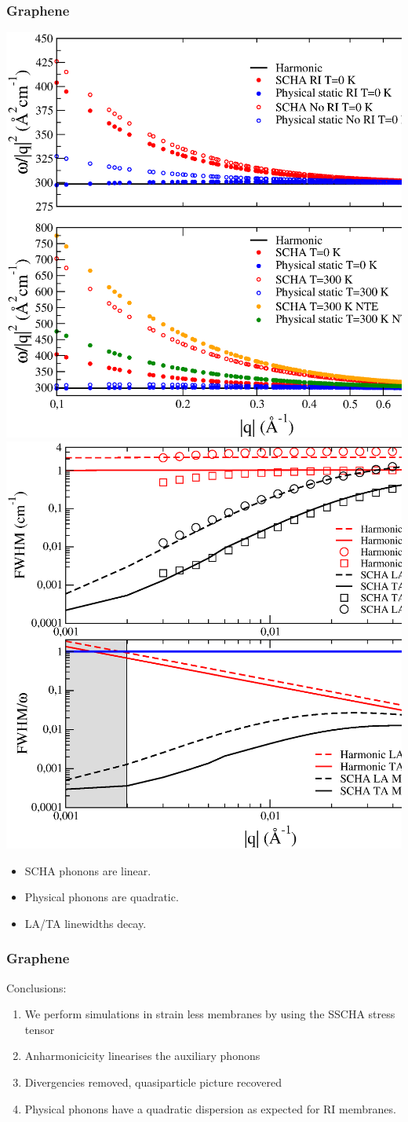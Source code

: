\documentclass{beamer}
\begin{document}
\begin{frame}

\frametitle{Graphene}
\begin{center}
 \includegraphics[width=0.49\linewidth]{Pictures/Graphene/membrane.eps}
 \includegraphics[width=0.49\linewidth]{Pictures/Graphene/lwmembrane.eps}
\end{center}
\begin{itemize}
 \item SCHA phonons are linear.
 \item Physical phonons are quadratic.
 \item LA/TA linewidths decay.
\end{itemize}

\end{frame}


\begin{frame}

 \frametitle{Graphene}
Conclusions:
 \begin{enumerate}
  \item We perform simulations in strain less membranes by using the SSCHA stress tensor
  \item Anharmonicicity linearises the auxiliary phonons 
  \item Divergencies removed, quasiparticle picture recovered
  \item Physical phonons have a quadratic dispersion as expected for RI membranes.
 \end{enumerate}

\end{frame}

\end{document}
